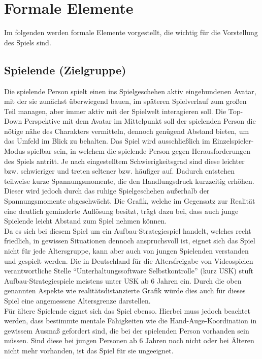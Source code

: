 \documentclass[paper=A4,pagesize=auto,12pt,headinclude=true,footinclude=true,BCOR=0mm,DIV=calc]{scrartcl}
\newcommand{\sectionspace}{
	\vspace{0.5cm}
}
\begin{document}
\sectionspace
\section{Formale Elemente}\label{sec:Formale_Elemente}
Im folgenden werden formale Elemente vorgestellt, die wichtig für die Vorstellung des Spiels sind.

\sectionspace
\subsection{Spielende (Zielgruppe)}\label{sec:Spieler}
Die spielende Person spielt einen ins Spielgeschehen aktiv eingebundenen Avatar, mit der sie zunächst überwiegend bauen, im späteren Spielverlauf zum großen Teil managen, aber immer aktiv mit der Spielwelt interagieren soll. Die Top-Down Perspektive mit dem Avatar im Mittelpunkt soll der spielenden Person die nötige nähe des Charakters vermitteln, dennoch genügend Abstand bieten, um das Umfeld im Blick zu behalten. Das Spiel wird ausschließlich im Einzelspieler-Modus spielbar sein, in welchem die spielende Person gegen Herausforderungen des Spiels antritt. Je nach eingestelltem Schwierigkeitsgrad sind diese leichter bzw. schwieriger und treten seltener bzw. häufiger auf. Dadurch entstehen teilweise kurze Spannungsmomente, die den Handlungsdruck kurzzeitig erhöhen. Dieser wird jedoch durch das ruhige Spielgeschehen außerhalb der Spannungsmomente abgeschwächt. Die Grafik, welche im Gegensatz zur Realität eine deutlich geminderte Auflösung besitzt, trägt dazu bei, dass auch junge Spielende leicht Abstand zum Spiel nehmen können.\\
Da es sich bei diesem Spiel um ein Aufbau-Strategiespiel handelt, welches recht friedlich, in gewissen Situationen dennoch anspruchsvoll ist, eignet sich das Spiel nicht für jede Altersgruppe, kann aber auch von jungen Spielenden verstanden und gespielt werden. Die in Deutschland für die Altersfreigabe von Videospielen verantwortliche Stelle "`Unterhaltungssoftware Selbstkontrolle"' (kurz USK) stuft Aufbau-Strategiespiele meistens unter USK ab 6 Jahren \cite{usk_6} ein. Durch die oben genannten Aspekte wie realitätsdistanzierte Grafik würde dies auch für dieses Spiel eine angemessene Altersgrenze darstellen. \\ 
Für ältere Spielende eignet sich das Spiel ebenso. Hierbei muss jedoch beachtet werden, dass bestimmte mentale Fähigkeiten wie die Hand-Auge-Koordination in gewissem Ausmaß gefordert sind, die bei der spielenden Person vorhanden sein müssen. Sind diese bei jungen Personen ab 6 Jahren noch nicht oder bei Älteren nicht mehr vorhanden, ist das Spiel für sie ungeeignet.
\end{document}
